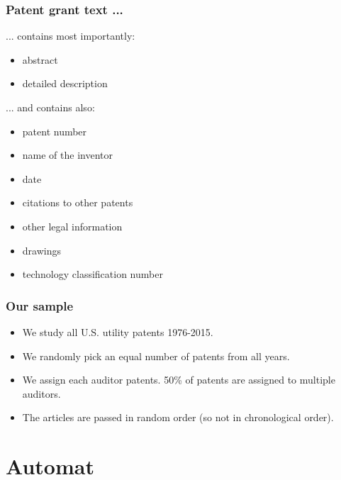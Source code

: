 \documentclass[10pt]{beamer}
\begin{document}
\begin{frame}\frametitle{Patent grant text ...}
... contains most importantly:
	\begin{itemize}	
		\item abstract
		\item detailed description
	\end{itemize}
... and contains also:
	\begin{itemize}	
		\item patent number
		\item name of the inventor
		\item date
		\item citations to other patents
		\item other legal information
		\item drawings
		\item technology classification number
	\end{itemize}
\end{frame}


\begin{frame}\frametitle{Our sample}
	\begin{itemize}	
	\item We study all U.S. utility patents 1976-2015.
	\item We randomly pick an equal number of patents from all years.
	\item We assign each auditor patents. 50\% of patents are assigned to multiple auditors.
	\item The articles are passed in random order (so not in chronological order).
	\end{itemize}
\end{frame}


\section{Automat}
\setcounter{subsection}{1} %
\end{document}
